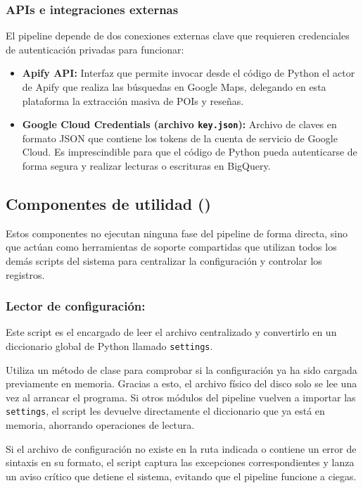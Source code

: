 \subsubsection{APIs e integraciones externas}
El pipeline depende de dos conexiones externas clave que requieren credenciales de autenticación privadas para funcionar:
\begin{itemize}
    \item \textbf{Apify API:} Interfaz que permite invocar desde el código de Python el actor de Apify que realiza las búsquedas en Google Maps, delegando en esta plataforma la extracción masiva de POIs y reseñas.
    \item \textbf{Google Cloud Credentials (archivo \texttt{key.json}):} Archivo de claves en formato JSON que contiene los tokens de la cuenta de servicio de Google Cloud. Es imprescindible para que el código de Python pueda autenticarse de forma segura y realizar lecturas o escrituras en BigQuery.
\end{itemize}

\subsection{Componentes de utilidad ()}
Estos componentes no ejecutan ninguna fase del pipeline de forma directa, sino que actúan como herramientas de soporte compartidas que utilizan todos los demás scripts del sistema para centralizar la configuración y controlar los registros.

\subsubsection{Lector de configuración: }
Este script es el encargado de leer el archivo centralizado  y convertirlo en un diccionario global de Python llamado \texttt{settings}.

Utiliza un método de clase para comprobar si la configuración ya ha sido cargada previamente en memoria. Gracias a esto, el archivo físico del disco solo se lee una vez al arrancar el programa. Si otros módulos del pipeline vuelven a importar las \texttt{settings}, el script les devuelve directamente el diccionario que ya está en memoria, ahorrando operaciones de lectura.

Si el archivo de configuración no existe en la ruta indicada o contiene un error de sintaxis en su formato, el script captura las excepciones correspondientes y lanza un aviso crítico que detiene el sistema, evitando que el pipeline funcione a ciegas.

